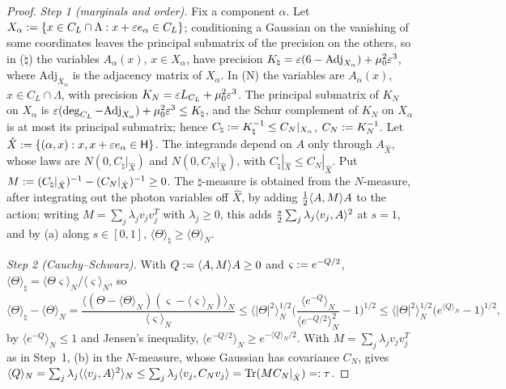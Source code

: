 \begin{proof}
\emph{Step 1 (marginals and order).} Fix a component $\alpha$. Let $X_\alpha:=\{x\in C_L\cap\Lambda:x+\varepsilon e_\alpha\in C_L\}$; conditioning a Gaussian on the vanishing of some coordinates leaves the principal submatrix of the precision on the others, so in ($\natural$) the variables $A_\alpha(x)$, $x\in X_\alpha$, have precision $K_\natural=\varepsilon(6-\mathrm{Adj}_{X_\alpha})+\mu_0^2\varepsilon^3$, where $\mathrm{Adj}_{X_\alpha}$ is the adjacency matrix of $X_\alpha$. In (N) the variables are $A_\alpha(x)$, $x\in C_L\cap\Lambda$, with precision $K_N=\varepsilon L_{C_L}+\mu_0^2\varepsilon^3$. The principal submatrix of $K_N$ on $X_\alpha$ is $\varepsilon(\deg_{C_L}-\mathrm{Adj}_{X_\alpha})+\mu_0^2\varepsilon^3\le K_\natural$, and the Schur complement of $K_N$ on $X_\alpha$ is at most its principal submatrix; hence $C_\natural:= K_\natural^{-1}\le C_N|_{X_\alpha}$, $C_N:= K_N^{-1}$. Let $\hat X:=\{(\alpha,x):x,x+\varepsilon e_\alpha\in\mathsf H\}$. The integrands depend on $A$ only through $A_{\hat X}$, whose laws are $N(0,C_\natural|_{\hat X})$ and $N(0,C_N|_{\hat X})$, with $C_\natural|_{\hat X}\le C_N|_{\hat X}$. Put $M:=(C_\natural|_{\hat X})^{-1}-(C_N|_{\hat X})^{-1}\ge0$. The $\natural$-measure is obtained from the $N$-measure, after integrating out the photon variables off $\hat X$, by adding $\frac12\langle A,M\rangle A$ to the action; writing $M=\sum_j\lambda_jv_jv_j^T$ with $\lambda_j\ge0$, this adds $\frac s2\sum_j\lambda_j\langle v_j,A\rangle^2$ at $s=1$, and by (a) along $s\in[0,1]$, $\langle\Theta\rangle_\natural\ge\langle\Theta\rangle_N$.

\emph{Step 2 (Cauchy--Schwarz).} With $Q:=\langle A,M\rangle A\ge0$ and $\varsigma:= e^{-Q/2}$, $\langle\Theta\rangle_\natural=\langle\Theta\varsigma\rangle_N/\langle\varsigma\rangle_N$, so
\[
\langle\Theta\rangle_\natural-\langle\Theta\rangle_N=\frac{\langle(\Theta-\langle\Theta\rangle_N)(\varsigma-\langle\varsigma\rangle_N)\rangle_N}{\langle\varsigma\rangle_N}
\le\langle|\Theta|^2\rangle_N^{1/2}\Big(\frac{\langle e^{-Q}\rangle_N}{\langle e^{-Q/2}\rangle_N^2}-1\Big)^{1/2}
\le\langle|\Theta|^2\rangle_N^{1/2}\big(e^{\langle Q\rangle_N}-1\big)^{1/2},
\]
by $\langle e^{-Q}\rangle_N\le1$ and Jensen's inequality, $\langle e^{-Q/2}\rangle_N\ge e^{-\langle Q\rangle_N/2}$. With $M=\sum_j\lambda_jv_jv_j^T$ as in Step~1, (b) in the $N$-measure, whose Gaussian has covariance $C_N$, gives $\langle Q\rangle_N=\sum_j\lambda_j\langle\langle v_j,A\rangle^2\rangle_N\le\sum_j\lambda_j\langle v_j,C_Nv_j\rangle=\operatorname{Tr}(MC_N|_{\hat X})=:\tau$.


\end{proof}

